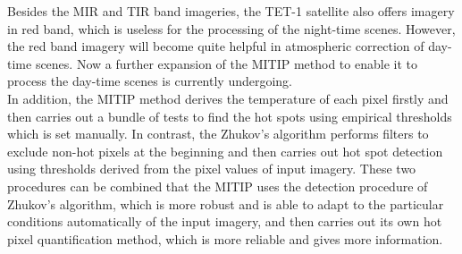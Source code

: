 \noindent Besides the MIR and TIR band imageries, the TET-1 satellite also offers imagery in red band, which is useless for the processing of the night-time scenes. However, the red band imagery will become quite helpful in atmospheric correction of day-time scenes. Now a further expansion of the MITIP method to enable it to process the day-time scenes is currently undergoing.\\

\noindent In addition, the MITIP method derives the temperature of each pixel firstly and then carries out a bundle of tests to find the hot spots using empirical thresholds which is set manually. In contrast, the Zhukov's algorithm performs filters to exclude non-hot pixels at the beginning and then carries out hot spot detection using thresholds derived from the pixel values of input imagery. These two procedures can be combined that the MITIP uses the detection procedure of Zhukov's algorithm, which is more robust and is able to adapt to the particular conditions automatically of the input imagery, and then carries out its own hot pixel quantification method, which is more reliable and gives more information.\\